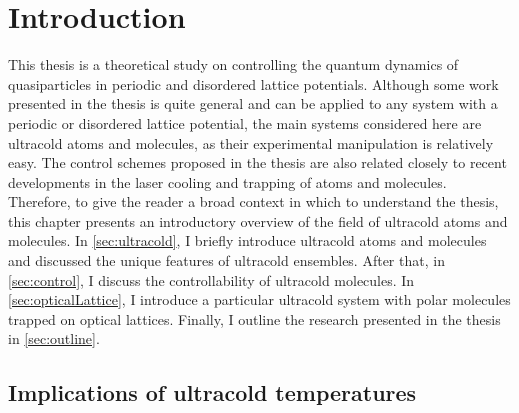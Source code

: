 
\chapter{Introduction}
\label{ch:Introduction}

This thesis is a theoretical study on controlling the quantum dynamics of quasiparticles in periodic and disordered lattice potentials. 
Although some work presented in the thesis is quite general and can be applied to any system with a periodic or disordered lattice potential, 
the main systems considered here are ultracold atoms and molecules, as their experimental manipulation is 
relatively easy. The control schemes proposed in the thesis are also related closely to recent developments in the laser 
cooling and trapping of atoms and molecules. Therefore, to give the reader a broad context in which to understand the 
thesis, this chapter presents an introductory overview of the field of ultracold atoms and molecules. In \autoref{sec:ultracold}, I briefly introduce ultracold  atoms and molecules and discussed the unique features of ultracold ensembles. After
that, in \autoref{sec:control}, I discuss the controllability of ultracold molecules. In
 \autoref{sec:opticalLattice}, I introduce a particular ultracold system with polar molecules trapped on optical lattices.  
Finally, I outline the research presented in the thesis in \autoref{sec:outline}. 

\section{Implications of ultracold temperatures}
\label{sec:ultracold}

